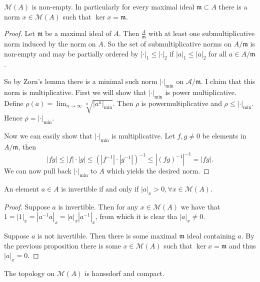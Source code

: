 \begin{proposition}
	$\mathcal{M} (A)$ is non-empty. 
	In particularly for every maximal ideal $\mathfrak{m}  \subset  A$ there is a norm $x \in \mathcal{M} (A)$ such that $\ker x = \mathfrak{m} $.
\end{proposition}
\begin{proof}
	Let $\mathfrak{m}$ be a maximal ideal of $A$. 
	Then $\frac{A}{\mathfrak{m} }$ with at least one submultiplicative norm induced by the norm on  $A$. 
	So the set of submultiplicative norms on  $A/\mathfrak{m} $ is non-empty and may be partially ordered by $|\cdot |_1 \le |\cdot |_2$ if $|a|_1 \le |a|_2$ for all $a \in A / \mathfrak{m} $. 

	So by Zorn's lemma there is a minimal such norm $|\cdot |_\text{min} $ on $\mathcal{A}  / \mathfrak{m} $. 
	I claim that this norm is multiplicative. 
	First we will show that $|\cdot |_\text{min} $ is power multiplicative. 
	Define $\rho(a) = \lim_{n \to \infty} \sqrt[n]{|a^{n}|_\text{min} } $. Then $\rho$ is powermultiplicative and $\rho \le |\cdot |_\text{min} $. Hence $\rho = |\cdot |_\text{min} $. 

	Now we can easily show that $|\cdot |_\text{min} $ is multiplicative. 
	Let $f, g \ne 0$ be elements in $A / \mathfrak{m} $, then \[
		|fg| \le |f|\cdot |g| \le (|f^{-1}| \cdot |g^{-1}|)^{-1} \le |(fg)^{-1}|^{-1} = |fg|. 
	\]
	We can now pull back $|\cdot |_\text{min} $ to $A$ which yields the desired norm. 
\end{proof}

\begin{corollary}\label{cor:non_vanish_invertible}
	An element $a \in A$ is invertible if and only if $|a|_x > 0, \forall x \in \mathcal{M} (A)$.
\end{corollary}
\begin{proof}
	\ltr
	Suppose $a $ is invertible. Then for any  $x \in \mathcal{M} (A)$ we have that $1 = |1|_x = |a^{-1}a|_x = |a|_x |a^{-1}|_x$, from which it is clear tha $|a|_x \ne 0$. 

	\rtl Suppose $a$ is not invertible. Then there is some maximal $\mathfrak{m}  $ ideal containing $a$. 
	By the previous proposition there is some $x \in \mathcal{M} (A)$ such that $\ker x = \mathfrak{m} $ and thus $|a|_x = 0$. 
\end{proof}

\begin{proposition}
	The topology on $\mathcal{M} (A)$ is haussdorf and compact. 
\end{proposition}
